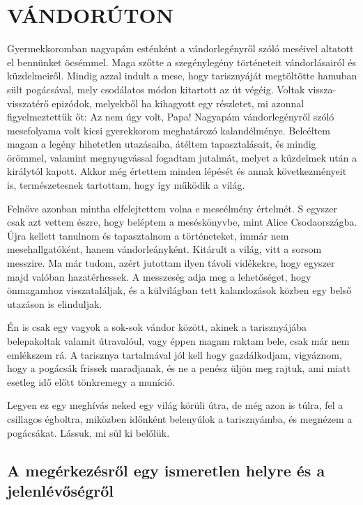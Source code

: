 \clearpage
\chapter{VÁNDORÚTON}

Gyermekkoromban nagyapám esténként a vándorlegényről szóló
meséivel altatott el bennünket öcsémmel. Maga szőtte a szegénylegény
történeteit vándorlásairól és küzdelmeiről. Mindig azzal indult
a mese, hogy tarisznyáját megtöltötte hamuban sült pogácsával, mely
csodálatos módon kitartott az út végéig. Voltak vissza-visszatérő
epizódok, melyekből ha kihagyott egy részletet, mi azonnal figyelmeztettük
őt: Az nem úgy volt, Papa! Nagyapám vándorlegényről szóló
mesefolyama volt kicsi gyerekkorom meghatározó kalandélménye. Beleéltem
magam a legény hihetetlen utazásaiba, átéltem tapasztalásait,
és mindig örömmel, valamint megnyugvással fogadtam jutalmát, melyet
a küzdelmek után a királytól kapott. Akkor még értettem minden
lépését és annak következményeit is, természetesnek tartottam, hogy
így működik a világ.

Felnőve azonban mintha elfelejtettem volna e meseélmény értelmét.
S egyszer csak azt vettem észre, hogy beléptem a meséskönyvbe,
mint Alice Csodaországba. Újra kellett tanulnom és tapasztalnom a
történeteket, immár nem mesehallgatóként, hanem vándorleányként.
Kitárult a világ, vitt a sorsom messzire. Ma már tudom, azért jutottam
ilyen távoli vidékekre, hogy egyszer majd valóban hazatérhessek.
A messzeség adja meg a lehetőséget, hogy önmagamhoz visszataláljak,
és a külvilágban tett kalandozások közben egy belső utazáson is
elinduljak.

Én is csak egy vagyok a sok-sok vándor között, akinek a tarisznyájába
belepakoltak valamit útravalóul, vagy éppen magam raktam bele,
csak már nem emlékszem rá. A tarisznya tartalmával jól kell hogy
gazdálkodjam, vigyáznom, hogy a pogácsák frissek maradjanak, és ne
a penész üljön meg rajtuk, ami miatt esetleg idő előtt tönkremegy a
muníció.

Legyen ez egy meghívás neked egy világ körüli útra, de még azon is
túlra, fel a csillagos égboltra, miközben időnként belenyúlok a
tarisznyámba, és megnézem a pogácsákat. Lássuk, mi sül ki belőlük.

\section{A megérkezésről egy ismeretlen helyre és a jelenlévőségről}

